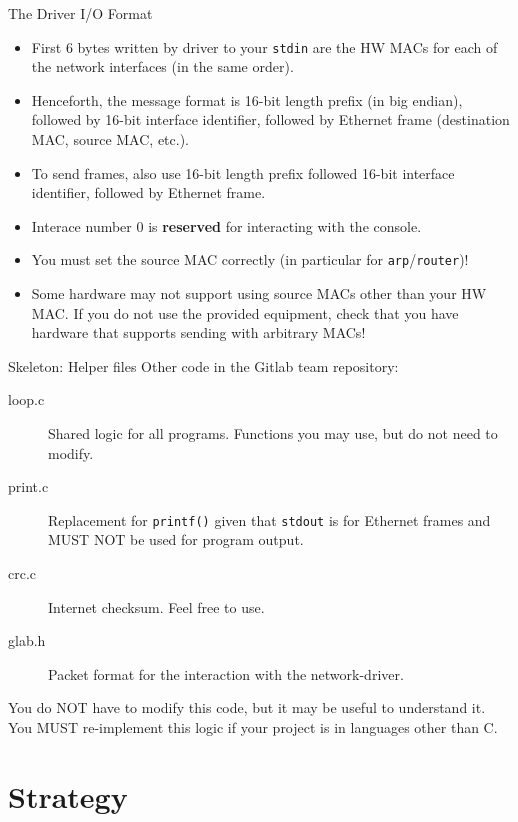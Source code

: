 \documentclass{beamer}
\begin{document}
\begin{frame}{The Driver I/O Format}
\begin{itemize}
\item First 6 bytes written by driver to your {\tt stdin} are the HW MACs
      for each of the network interfaces (in the same order).
\item Henceforth, the message format is 16-bit length prefix (in big endian),
      followed by 16-bit interface identifier,
      followed by Ethernet frame (destination MAC, source MAC, etc.).
\item To send frames, also use 16-bit length prefix followed
      16-bit interface identifier, followed by Ethernet frame.
\item Interace number 0 is {\bf reserved} for interacting with the console.
\item You must set the source MAC correctly (in particular for {\tt arp}/{\tt router})!
\item Some hardware may not support using source MACs other than your
      HW MAC. If you do not use the provided equipment, check that you have
      hardware that supports sending with arbitrary MACs!
\end{itemize}
\end{frame}


\begin{frame}{Skeleton: Helper files}
Other code in the Gitlab team repository:
\begin{description}
\item[loop.c] Shared logic for all programs. Functions you may use, but
   do not need to modify.
\item[print.c] Replacement for {\tt printf()} given that {\tt stdout}
   is for Ethernet frames and MUST NOT be used for program output.
\item[crc.c] Internet checksum. Feel free to use.
\item[glab.h] Packet format for the interaction with the network-driver.
\end{description}
You do NOT have to modify this code, but it may be useful to understand
it. You MUST re-implement this logic if your project is in languages
other than C.
\end{frame}


\section{Strategy}
\end{document}
